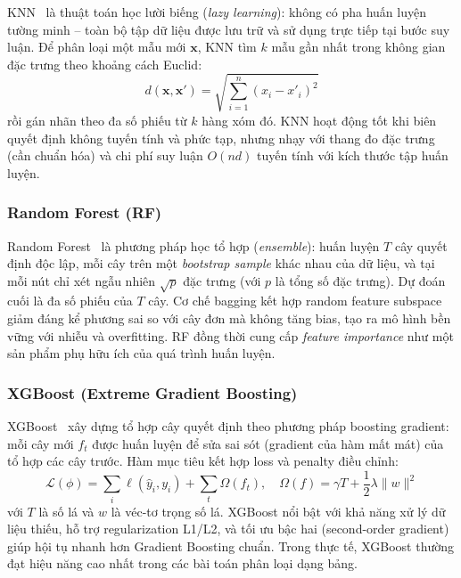 KNN~\cite{pedregosa2011scikit} là thuật toán học lười biếng (\textit{lazy learning}): không có pha huấn luyện tường minh -- toàn bộ tập dữ liệu được lưu trữ và sử dụng trực tiếp tại bước suy luận. Để phân loại một mẫu mới $\mathbf{x}$, KNN tìm $k$ mẫu gần nhất trong không gian đặc trưng theo khoảng cách Euclid:
\begin{equation}
    d(\mathbf{x}, \mathbf{x}') = \sqrt{\sum_{i=1}^{n} (x_i - x'_i)^2}
\end{equation}
rồi gán nhãn theo đa số phiếu từ $k$ hàng xóm đó. KNN hoạt động tốt khi biên quyết định không tuyến tính và phức tạp, nhưng nhạy với thang đo đặc trưng (cần chuẩn hóa) và chi phí suy luận $O(nd)$ tuyến tính với kích thước tập huấn luyện.

\subsubsection{Random Forest (RF)}

Random Forest~\cite{pedregosa2011scikit} là phương pháp học tổ hợp (\textit{ensemble}): huấn luyện $T$ cây quyết định độc lập, mỗi cây trên một \textit{bootstrap sample} khác nhau của dữ liệu, và tại mỗi nút chỉ xét ngẫu nhiên $\sqrt{p}$ đặc trưng (với $p$ là tổng số đặc trưng). Dự đoán cuối là đa số phiếu của $T$ cây. Cơ chế bagging kết hợp random feature subspace giảm đáng kể phương sai so với cây đơn mà không tăng bias, tạo ra mô hình bền vững với nhiễu và overfitting. RF đồng thời cung cấp \textit{feature importance} như một sản phẩm phụ hữu ích của quá trình huấn luyện.

\subsubsection{XGBoost (Extreme Gradient Boosting)}

XGBoost~\cite{chen2016xgboost} xây dựng tổ hợp cây quyết định theo phương pháp boosting gradient: mỗi cây mới $f_t$ được huấn luyện để sửa sai sót (gradient của hàm mất mát) của tổ hợp các cây trước. Hàm mục tiêu kết hợp loss và penalty điều chỉnh:
\begin{equation}
    \mathcal{L}(\phi) = \sum_{i} \ell(\hat{y}_i, y_i) + \sum_{t} \Omega(f_t), \quad \Omega(f) = \gamma T + \frac{1}{2}\lambda \|w\|^2
\end{equation}
với $T$ là số lá và $w$ là véc-tơ trọng số lá. XGBoost nổi bật với khả năng xử lý dữ liệu thiếu, hỗ trợ regularization L1/L2, và tối ưu bậc hai (second-order gradient) giúp hội tụ nhanh hơn Gradient Boosting chuẩn. Trong thực tế, XGBoost thường đạt hiệu năng cao nhất trong các bài toán phân loại dạng bảng.

